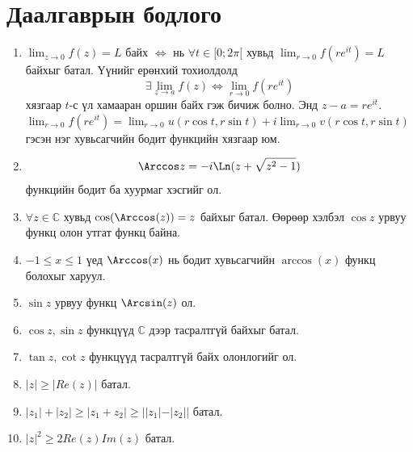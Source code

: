 \section*{Даалгаврын бодлого}

\begin{enumerate}

\item $\displaystyle \lim_{z\to 0} f(z)=L$ байх $\Longleftrightarrow $ нь $\forall t\in [0;2\pi[$ хувьд $\displaystyle \lim_{r\to 0} f(re^{it})=L$ байхыг батал. Үүнийг ерөнхий тохиолдолд  
$$\exists\displaystyle \lim_{z\to a} f(z) \Longleftrightarrow \displaystyle \lim_{r\to 0} f(re^{it})$$ хязгаар $t$-с үл хамааран оршин байх гэж бичиж болно. Энд $z-a=re^{it}.$ $\displaystyle\lim_{r\to 0} f(re^{it})=\lim_{r\to 0} u(r\cos t, r\sin t)+i\lim_{r\to 0} v(r\cos t, r\sin t)$ гэсэн нэг хувьсагчийн бодит функцийн хязгаар юм. 

\item 
\begin{equation}
\Arccos z= -i \Ln (z+\sqrt{z^2-1}) 
\end{equation} функцийн бодит ба хуурмаг хэсгийг ол. 

\item $\forall z\in\mathbb{C}$ хувьд $\cos(\Arccos(z))=z$ байхыг батал. Өөрөөр хэлбэл $\cos z$ урвуу функц олон утгат функц байна.

\item $-1\leq x\leq 1$ үед $\Arccos(x)$ нь бодит хувьсагчийн $\arccos(x)$ функц болохыг харуул.

\item $\sin z$ урвуу функц $\Arcsin(z)$ ол.

\item $\cos z, \sin z$ функцүүд $\mathbb{C}$ дээр тасралтгүй байхыг батал.

\item  $\tan z, \cot z$ функцүүд тасралтгүй байх олонлогийг ол.

\item $|z|\geq |Re(z)|$ батал.

\item $|z_1|+|z_2|\geq |z_1+z_2|\geq ||z_1|-|z_2||$ батал.

\item $|z|^2\geq 2Re(z)Im(z)$ батал.

\end{enumerate}
